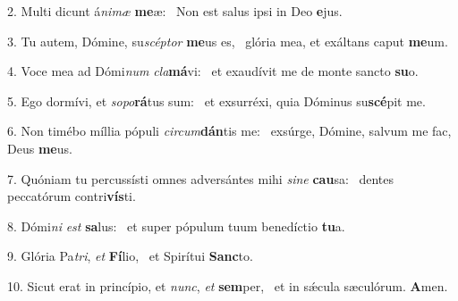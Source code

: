 2. Multi dicunt á\textit{ni}\textit{mæ} \textbf{me}æ: \ast\  Non est salus ipsi in Deo \textbf{e}jus.\

3. Tu autem, Dómine, su\textit{scép}\textit{tor} \textbf{me}us es, \ast\  glória mea, et exáltans caput \textbf{me}um.\

4. Voce mea ad Dómi\textit{num} \textit{cla}\textbf{má}vi: \ast\  et exaudívit me de monte sancto \textbf{su}o.\

5. Ego dormívi, et \textit{so}\textit{po}\textbf{rá}tus sum: \ast\  et exsurréxi, quia Dóminus su\textbf{scé}pit me.\

6. Non timébo míllia pópuli \textit{cir}\textit{cum}\textbf{dán}tis me: \ast\  exsúrge, Dómine, salvum me fac, Deus \textbf{me}us.\

7. Quóniam tu percussísti omnes adversántes mihi \textit{si}\textit{ne} \textbf{cau}sa: \ast\  dentes peccatórum contri\textbf{vís}ti.\

8. Dómi\textit{ni} \textit{est} \textbf{sa}lus: \ast\  et super pópulum tuum benedíctio \textbf{tu}a.\

9. Glória Pa\textit{tri}, \textit{et} \textbf{Fí}lio, \ast\  et Spirítui \textbf{Sanc}to.\

10. Sicut erat in princípio, et \textit{nunc}, \textit{et} \textbf{sem}per, \ast\  et in sǽcula sæculórum. \textbf{A}men.\

